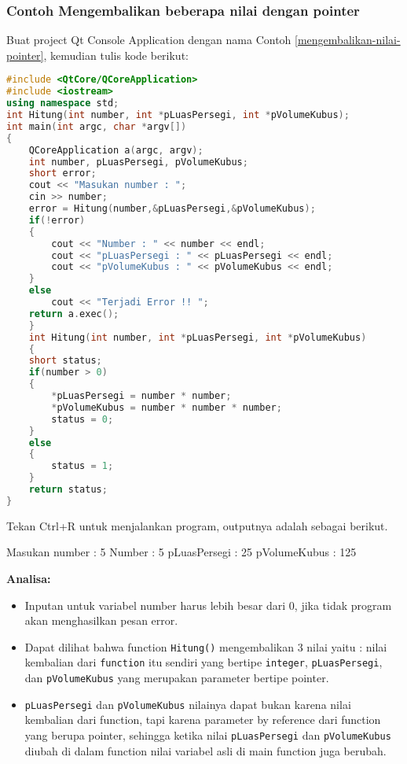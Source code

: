 \subsubsection*{Contoh  Mengembalikan beberapa nilai dengan pointer}

Buat project Qt Console Application dengan nama Contoh \ref{mengembalikan-nilai-pointer}, kemudian
tulis kode berikut:

\begin{lstlisting}[language=c++, caption=Mengembalikan beberapa nilai dengan pointer, label=mengembalikan-nilai-pointer]
#include <QtCore/QCoreApplication>
#include <iostream>
using namespace std;
int Hitung(int number, int *pLuasPersegi, int *pVolumeKubus);
int main(int argc, char *argv[])
{
    QCoreApplication a(argc, argv);
    int number, pLuasPersegi, pVolumeKubus;
    short error;
    cout << "Masukan number : ";
    cin >> number;
    error = Hitung(number,&pLuasPersegi,&pVolumeKubus);
    if(!error)
    {
        cout << "Number : " << number << endl;
        cout << "pLuasPersegi : " << pLuasPersegi << endl;
        cout << "pVolumeKubus : " << pVolumeKubus << endl;
    }
    else
        cout << "Terjadi Error !! ";
    return a.exec();
    }
    int Hitung(int number, int *pLuasPersegi, int *pVolumeKubus)
    {
    short status;
    if(number > 0)
    {
        *pLuasPersegi = number * number;
        *pVolumeKubus = number * number * number;
        status = 0;
    }
    else
    {
        status = 1;
    }
    return status;
}
\end{lstlisting}

Tekan Ctrl+R untuk menjalankan program, outputnya adalah sebagai
berikut.

\begin{lcverbatim}
Masukan number : 5
Number : 5
pLuasPersegi : 25
pVolumeKubus : 125
\end{lcverbatim}

\textbf{Analisa:}

\begin{itemize}
\tightlist
\item
  Inputan untuk variabel number harus lebih besar dari 0, jika tidak
  program akan menghasilkan pesan error.
\item
  Dapat dilihat bahwa function \texttt{Hitung()} mengembalikan 3 nilai
  yaitu : nilai kembalian dari \texttt{function} itu sendiri yang
  bertipe \texttt{integer}, \texttt{pLuasPersegi}, dan
  \texttt{pVolumeKubus} yang merupakan parameter bertipe pointer.
\item
  \texttt{pLuasPersegi} dan \texttt{pVolumeKubus} nilainya dapat bukan
  karena nilai kembalian dari function, tapi karena parameter by
  reference dari function yang berupa pointer, sehingga ketika nilai
  \texttt{pLuasPersegi} dan \texttt{pVolumeKubus} diubah di dalam
  function nilai variabel asli di main function juga berubah.
\end{itemize}

